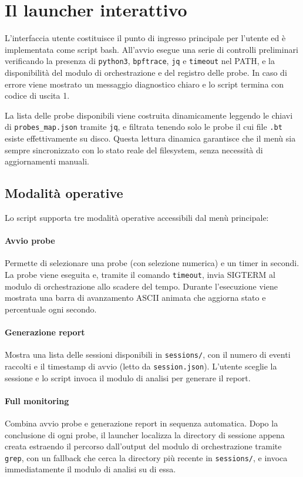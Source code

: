 \section{Il launcher interattivo}

L'interfaccia utente costituisce il punto di ingresso principale per l'utente ed è implementata come script bash. All'avvio esegue una serie di controlli preliminari verificando la presenza di \texttt{python3}, \texttt{bpftrace}, \texttt{jq} e \texttt{timeout} nel PATH, e la disponibilità del modulo di orchestrazione e del registro delle probe. In caso di errore viene mostrato un messaggio diagnostico chiaro e lo script termina con codice di uscita 1.

La lista delle probe disponibili viene costruita dinamicamente leggendo le chiavi di \texttt{probes\_map.json} tramite \texttt{jq}, e filtrata tenendo solo le probe il cui file \texttt{.bt} esiste effettivamente su disco. Questa lettura dinamica garantisce che il menù sia sempre sincronizzato con lo stato reale del filesystem, senza necessità di aggiornamenti manuali.

\subsection{Modalità operative}

Lo script supporta tre modalità operative accessibili dal menù principale:

\paragraph{Avvio probe} Permette di selezionare una probe (con selezione numerica) e un timer in secondi. La probe viene eseguita e, tramite il comando \texttt{timeout}, invia SIGTERM al modulo di orchestrazione allo scadere del tempo. Durante l'esecuzione viene mostrata una barra di avanzamento ASCII animata che aggiorna stato e percentuale ogni secondo.

\paragraph{Generazione report} Mostra una lista delle sessioni disponibili in \texttt{sessions/}, con il numero di eventi raccolti e il timestamp di avvio (letto da \texttt{session.json}). L'utente sceglie la sessione e lo script invoca il modulo di analisi per generare il report.

\paragraph{Full monitoring} Combina avvio probe e generazione report in sequenza automatica. Dopo la conclusione di ogni probe, il launcher localizza la directory di sessione appena creata estraendo il percorso dall'output del modulo di orchestrazione tramite \texttt{grep}, con un fallback che cerca la directory più recente in \texttt{sessions/}, e invoca immediatamente il modulo di analisi su di essa.

